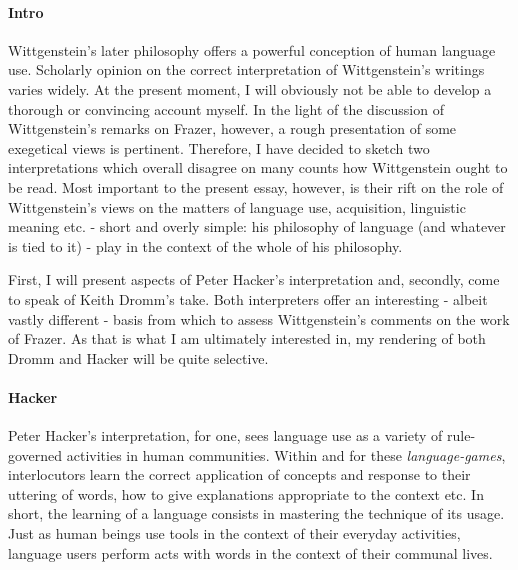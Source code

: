 \documentclass{article}
\begin{document}
\paragraph{Intro} Wittgenstein's later philosophy offers a powerful conception of human language use. Scholarly opinion on the correct interpretation of Wittgenstein's writings varies widely. At the present moment, I will obviously not be able to develop a thorough or convincing account myself. In the light of the discussion of Wittgenstein's remarks on Frazer, however, a rough presentation of some exegetical views is pertinent. Therefore, I have decided to sketch two interpretations which overall disagree on many counts how Wittgenstein ought to be read. Most important to the present essay, however, is their rift on the role of Wittgenstein's views on the matters of language use, acquisition, linguistic meaning etc. - short and overly simple: his philosophy of language (and whatever is tied to it) - play in the context of the whole of his philosophy.

First, I will present aspects of Peter Hacker's interpretation and, secondly, come to speak of Keith Dromm's take. Both interpreters offer an interesting - albeit vastly different - basis from which to assess Wittgenstein's comments on the work of Frazer. As that is what I am ultimately interested in, my rendering of both Dromm and Hacker will be quite selective.

\paragraph{Hacker} Peter Hacker's interpretation, for one, sees language use as a variety of rule-governed activities in human communities. Within and for these \textit{language-games}, interlocutors learn the correct application of concepts and response to their uttering of words, how to give explanations appropriate to the context etc. In short, the learning of a language consists in mastering the technique of its usage.
Just as human beings use tools in the context of their everyday activities, language users perform acts with words in the context of their communal lives. 
\end{document}

